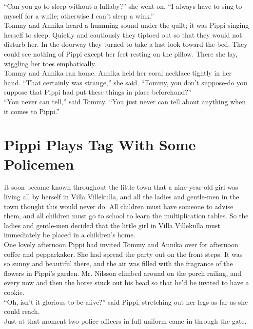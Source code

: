 \documentclass{standard}
\begin{document}
``Can you go to sleep without a lullaby?” she went on. ``I always have to sing to myself for a while; otherwise I can’t sleep a wink.”\\

Tommy and Annika heard a humming sound under the quilt; it was Pippi singing herself to sleep. Quietly and cautiously they tiptoed out so that they would not disturb her. In the doorway they turned to take a last look toward the bed. They could see nothing of Pippi except her feet resting on the pillow. There she lay, wiggling her toes emphatically.\\

Tommy and Annika ran home. Annika held her coral necklace tightly in her hand.
``That certainly was strange,” she said. ``Tommy, you don’t suppose-do you suppose that Pippi had put these things in place beforehand?”\\

``You never can tell,” said Tommy. ``You just never can tell about anything when it comes to Pippi.”
\newpage


\section{Pippi Plays Tag With Some Policemen}
It soon became known throughout the little town that a nine-year-old girl was living all by herself in Villa Villekulla, and all the ladies and gentle-men in the town thought this would never do. All children must have someone to advise them, and all children must go to school to learn the multiplication tables. So the ladies and gentle-men decided that the little girl in Villa Villekulla must immediately be placed in a children’s home.\\

One lovely afternoon Pippi had invited Tommy and Annika over for afternoon coffee and pepparkakor. She had spread the party out on the front steps. It was so sunny and beautiful there, and the air was filled with the fragrance of the flowers in Pippi’s garden. Mr. Nilsson climbed around on the porch railing, and every now and then the horse stuck out his head so that he’d be invited to have a cookie.\\

“Oh, isn’t it glorious to be alive?” said Pippi, stretching out her legs as far as she could reach.\\

Just at that moment two police officers in full uniform came in through the gate.\\
\end{document}
